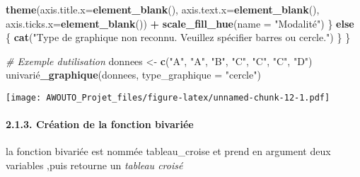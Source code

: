 \documentclass[
]{article}
\newenvironment{Shaded}{\begin{snugshade}}{\end{snugshade}}
\newcommand{\AttributeTok}[1]{\textcolor[rgb]{0.13,0.29,0.53}{#1}}
\newcommand{\CommentTok}[1]{\textcolor[rgb]{0.56,0.35,0.01}{\textit{#1}}}
\newcommand{\ControlFlowTok}[1]{\textcolor[rgb]{0.13,0.29,0.53}{\textbf{#1}}}
\newcommand{\FunctionTok}[1]{\textcolor[rgb]{0.13,0.29,0.53}{\textbf{#1}}}
\newcommand{\NormalTok}[1]{#1}
\newcommand{\OtherTok}[1]{\textcolor[rgb]{0.56,0.35,0.01}{#1}}
\newcommand{\SpecialCharTok}[1]{\textcolor[rgb]{0.81,0.36,0.00}{\textbf{#1}}}
\newcommand{\StringTok}[1]{\textcolor[rgb]{0.31,0.60,0.02}{#1}}
\begin{document}
\begin{Shaded}
\begin{Highlighting}[]
      \FunctionTok{theme}\NormalTok{(}\AttributeTok{axis.title.x=}\FunctionTok{element\_blank}\NormalTok{(),}
            \AttributeTok{axis.text.x=}\FunctionTok{element\_blank}\NormalTok{(),}
            \AttributeTok{axis.ticks.x=}\FunctionTok{element\_blank}\NormalTok{()) }\SpecialCharTok{+}
      \FunctionTok{scale\_fill\_hue}\NormalTok{(}\AttributeTok{name =} \StringTok{"Modalité"}\NormalTok{)}
\NormalTok{  \} }\ControlFlowTok{else}\NormalTok{ \{}
    \FunctionTok{cat}\NormalTok{(}\StringTok{"Type de graphique non reconnu. Veuillez spécifier \textquotesingle{}barres\textquotesingle{} ou \textquotesingle{}cercle\textquotesingle{}."}\NormalTok{)}
\NormalTok{  \}}
\NormalTok{\}}

\CommentTok{\# Exemple d\textquotesingle{}utilisation}
\NormalTok{donnees }\OtherTok{\textless{}{-}} \FunctionTok{c}\NormalTok{(}\StringTok{"A"}\NormalTok{, }\StringTok{"A"}\NormalTok{, }\StringTok{"B"}\NormalTok{, }\StringTok{"C"}\NormalTok{, }\StringTok{"C"}\NormalTok{, }\StringTok{"C"}\NormalTok{, }\StringTok{"D"}\NormalTok{)}
\NormalTok{univarié}\FunctionTok{\_graphique}\NormalTok{(donnees, }\AttributeTok{type\_graphique =} \StringTok{"cercle"}\NormalTok{)}
\end{Highlighting}
\end{Shaded}

\texttt{[image: AWOUTO\_Projet\_files/figure-latex/unnamed-chunk-12-1.pdf]}

\hypertarget{cruxe9ation-de-la-fonction-bivariuxe9e}{%
\paragraph{2.1.3. Création de la fonction
bivariée}\label{cruxe9ation-de-la-fonction-bivariuxe9e}}

la fonction bivariée est nommée tableau\_croise et prend en argument
deux variables ,puis retourne un \emph{tableau croisé}
\end{document}
